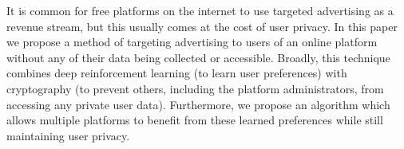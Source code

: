It is common for free platforms on the internet to use targeted advertising as a revenue stream, but this usually comes at the cost of user privacy. In this paper we propose a method of targeting advertising to users of an online platform without any of their data being collected or accessible. Broadly, this technique combines deep reinforcement learning (to learn user preferences) with cryptography (to prevent others, including the platform administrators, from accessing any private user data). Furthermore, we propose an algorithm which allows multiple platforms to benefit from these learned preferences while still maintaining user privacy.